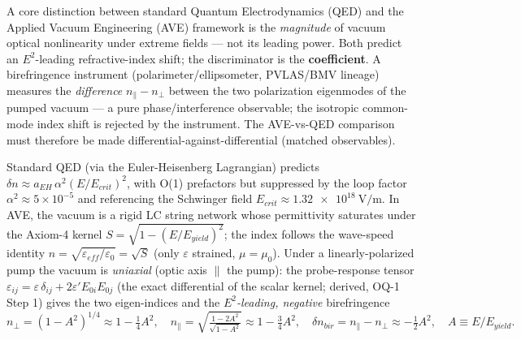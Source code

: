 A core distinction between standard Quantum Electrodynamics (QED) and the Applied Vacuum Engineering (AVE) framework is the \emph{magnitude} of vacuum optical nonlinearity under extreme fields --- not its leading power. Both predict an $E^2$-leading refractive-index shift; the discriminator is the \textbf{coefficient}. A birefringence instrument (polarimeter/ellipsometer, PVLAS/BMV lineage) measures the \emph{difference} $n_\parallel-n_\perp$ between the two polarization eigenmodes of the pumped vacuum --- a pure phase/interference observable; the isotropic common-mode index shift is rejected by the instrument. The AVE-vs-QED comparison must therefore be made differential-against-differential (matched observables).

Standard QED (via the Euler-Heisenberg Lagrangian) predicts $\delta n \approx a_{EH}\,\alpha^2 (E/E_{crit})^2$, with O(1) prefactors but suppressed by the loop factor $\alpha^2\approx 5\times10^{-5}$ and referencing the Schwinger field $E_{crit}\approx\qty{1.32e18}{\volt\per\metre}$. In AVE, the vacuum is a rigid LC string network whose permittivity saturates under the Axiom-4 kernel $S=\sqrt{1-(E/E_{yield})^2}$; the index follows the wave-speed identity $n=\sqrt{\varepsilon_{eff}/\varepsilon_0}=\sqrt{S}$ (only $\varepsilon$ strained, $\mu=\mu_0$). Under a linearly-polarized pump the vacuum is \emph{uniaxial} (optic axis $\parallel$ the pump): the probe-response tensor $\varepsilon_{ij}=\varepsilon\,\delta_{ij}+2\varepsilon'E_{0i}E_{0j}$ (the exact differential of the scalar kernel; derived, OQ-1 Step 1) gives the two eigen-indices and the \emph{$E^2$-leading, negative} birefringence
\begin{equation}
n_\perp=(1-A^2)^{1/4}\approx 1-\tfrac14 A^2,\quad n_\parallel=\sqrt{\tfrac{1-2A^2}{\sqrt{1-A^2}}}\approx 1-\tfrac34 A^2,\quad \delta n_{bir}=n_\parallel-n_\perp\approx -\tfrac12 A^2,\quad A\equiv E/E_{yield}.
\end{equation}
